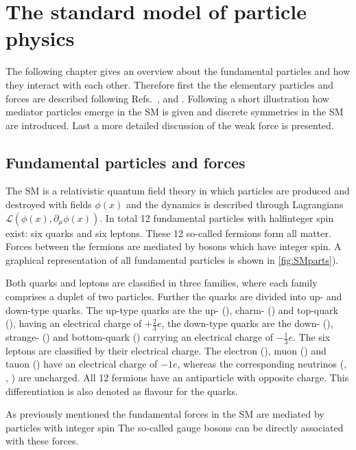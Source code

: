 \chapter{The standard model of particle physics}
\label{chap:SM}

The following chapter gives an overview about the fundamental particles and how they interact with each other.
Therefore first the the elementary particles and forces are described following Refs.~\cite{Griffiths:111880}, \cite{Perkins:396126} and \cite{Peskin:257493}.
Following a short illustration how mediator particles emerge in the \ac{SM} is given and discrete symmetries in the \ac{SM} are introduced.
Last a more detailed discussion of the weak force is presented.

\section{Fundamental particles and forces}
\label{sec:fundamentalparts}

The \ac{SM} is a relativistic quantum field theory in which particles are produced and destroyed with fields $\phi(x)$ and the dynamics is described through Lagrangians $\mathcal{L}\left(\phi(x),\partial_{\mu}\phi(x)\right)$.
In total \num{12} fundamental particles with halfinteger spin exist: six quarks and six leptons.
These \num{12} so-called fermions form all matter.
Forces between the fermions are mediated by bosons which have integer spin.
A graphical representation of all fundamental particles is shown in \cref{fig:SMparts}).

Both quarks and leptons are classified in three families, where each family comprises a duplet of two particles.
Further the quarks are divided into up- and down-type quarks. The up-type quarks are the up- (\uquark), charm- (\cquark) and top-quark (\tquark), having an electrical charge of $+\frac{2}{3}e$, the down-type quarks are the down- (\dquark), strange- (\squark) and bottom-quark (\bquark) carrying an electrical charge of $-\frac{1}{3}e$.
The six leptons are classified by their electrical charge.
The electron  (\electron), muon (\muon) and tauon (\tauon) have an electrical charge of $-1e$, whereas the corresponding neutrinos (\neue, \neum, \neut) are uncharged.
All \num{12} fermions have an antiparticle with opposite charge.
This differentiation is also denoted as flavour for the quarks.

As previously mentioned the fundamental forces in the \ac{SM} are mediated by particles with integer spin The so-called gauge bosons can be directly associated with these forces.

